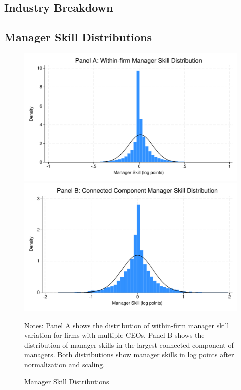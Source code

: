 \documentclass[11pt,a4paper]{article}
\begin{document}


\subsection{Industry Breakdown}






\subsection{Manager Skill Distributions}

\begin{figure}[htbp]
\centering
\begin{minipage}{0.48\textwidth}
\centering
\includegraphics[width=\textwidth]{figure/manager_skill_within.pdf}
\end{minipage}
\hfill
\begin{minipage}{0.48\textwidth}
\centering
\includegraphics[width=\textwidth]{figure/manager_skill_connected.pdf}
\end{minipage}
\caption{Manager Skill Distributions}
\label{fig:manager_skills_appendix}
\footnotesize
Notes: Panel A shows the distribution of within-firm manager skill variation for firms with multiple CEOs. Panel B shows the distribution of manager skills in the largest connected component of managers. Both distributions show manager skills in log points after normalization and scaling.
\end{figure}
\end{document}
